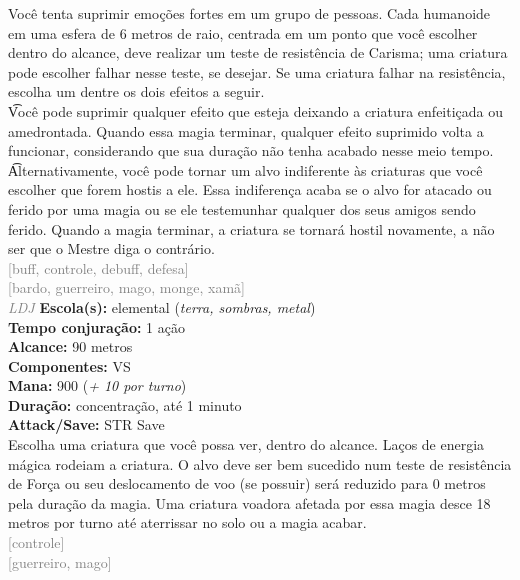 \documentclass{RPG_Adventure}[2021/10/20]
\begin{document}
{\normalsize Você tenta suprimir emoções fortes em um grupo de pessoas. Cada humanoide em uma esfera de 6 metros de raio, centrada em um ponto que você escolher dentro do alcance, deve realizar um teste de resistência de Carisma; uma criatura pode escolher falhar nesse teste, se desejar.  Se uma criatura falhar na resistência, escolha um dentre os dois efeitos a seguir.\\\t Você pode suprimir qualquer efeito que esteja deixando a criatura enfeitiçada ou amedrontada. Quando essa magia terminar, qualquer efeito suprimido volta a funcionar, considerando que sua duração não tenha acabado nesse meio tempo.\\\t Alternativamente, você pode tornar um alvo indiferente às criaturas que você escolher que forem hostis a ele. Essa indiferença acaba se o alvo for atacado ou ferido por uma magia ou se ele testemunhar qualquer dos seus amigos sendo ferido. Quando a magia terminar, a criatura se tornará hostil novamente, a não ser que o Mestre diga o contrário.\\}
{\scriptsize \textcolor{gray}{[buff, controle, debuff, defesa]\\}}
{\scriptsize \textcolor{gray}{[bardo, guerreiro, mago, monge, xamã]\\}}
{\tiny \textcolor{gray}{\textit{LDJ}}}\jump{}
{\small \t \textbf{Escola(s):} elemental (\textit{terra, sombras, metal})\\\t \textbf{Tempo conjuração:} 1 ação\\\t \textbf{Alcance:} 90 metros\\\t \textbf{Componentes:} VS\\\t \textbf{Mana:} 900 (\textit{+ 10 por turno})\\\t \textbf{Duração:} concentração, até 1 minuto\\\t \textbf{Attack/Save:} STR Save\\}
{\normalsize Escolha uma criatura que você possa ver, dentro do alcance. Laços de energia mágica rodeiam a criatura. O alvo deve ser bem sucedido num teste de resistência de Força ou seu deslocamento de voo (se possuir) será reduzido para 0 metros pela duração da magia. Uma criatura voadora afetada por essa magia desce 18 metros por turno até aterrissar no solo ou a magia acabar.\\}
{\scriptsize \textcolor{gray}{[controle]\\}}
{\scriptsize \textcolor{gray}{[guerreiro, mago]\\}}
\end{document}
